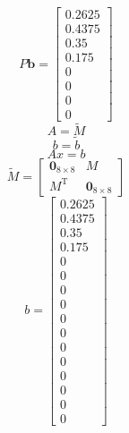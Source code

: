 \documentclass[a4paper, 12pt]{article}
\begin{document}
\[
P\mathbf{b} = 
\begin{bmatrix}
0.2625 \\ 0.4375 \\ 0.35 \\ 0.175 \\ 0 \\ 0 \\ 0 \\ 0
\end{bmatrix}
\]
\[A=\widetilde{M}
\]
\[
b=\widetilde{b}
\]
\[A x=b
\]
\[
\widetilde{M} =
\begin{bmatrix}
\mathbf{0}_{8\times8} & M \\
M^{\mathrm{T}} & \mathbf{0}_{8\times8}
\end{bmatrix}
\]
\[
b=
\begin{bmatrix}
0.2625 \\ 0.4375 \\ 0.35 \\ 0.175 \\ 0 \\ 0 \\ 0 \\ 0\\
0 \\ 0 \\ 0 \\ 0 \\ 0 \\ 0 \\ 0 \\ 0
\end{bmatrix}
\]
\end{document}
